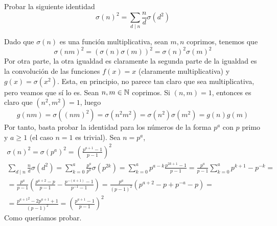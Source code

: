 \documentclass[twoside]{article}
\begin{document}
\newpage


\begin{ejercicio}{11}
Probar la siguiente identidad	
\[
\sigma(n)^2 = \sum_{d\mid n} \frac{n}{d}\sigma(d^2) 
\]
\begin{sol}
Dado que $\sigma(n)$ es una función multiplicativa, sean $m,n$ coprimos, tenemos que
\[
\sigma(nm)^2 = (\sigma(n)\sigma(m))^2 = \sigma(n)^2\sigma(m)^2
\]
Por otra parte, la otra igualdad es claramente la segunda parte de la igualdad es la convolución de las funciones $f(x)=x$ (claramente multiplicativa) y $g(x)=\sigma(x^2)$. Esta, en principio, no parece tan claro que sea multiplicativa, pero veamos que sí lo es. Sean $n,m\in\mathbb{N}$ coprimos. Si $(n,m)=1$, entonces es claro que $(n^2,m^2)=1$, luego
$$
g(nm)=\sigma((nm)^2) = \sigma(n^2 m^2)= \sigma(n^2)\sigma(m^2)=g(n)g(m)$$
Por tanto, basta probar la identidad para los números de la forma $p^a$ con $p$ primo y $a\geq 1$ (el caso $n=1$ es trivial). Sea $n=p^a$,
\begin{gather*}
\sigma(n)^2 = \sigma(p^a)^2 = \left(\frac{p^{a+1}-1}{p-1}\right)^2\\  \sum_{d\mid n} \frac{n}{d}\sigma(d^2) = \sum_{k=0}^a \frac{p^a}{p^k}\sigma(p^{2k})= \sum_{k=0}^a p^{a-k}\frac{p^{2k+1}-1}{p-1} = \frac{p^a}{p-1} \sum_{k=0}^a p^{k+1}- p^{-k} = \\
 = \frac{p^a}{p-1} \left(\frac{p^{a+2}-p}{p-1}-\frac{p^{-(a+1)}-1}{p^{-1}-1}\right) = \frac{p^a}{(p-1)^2}(p^{a+2}-p+ p^{-a}-p) = \\
 = \frac{{p^{a+1}}^2-2p^{a+1}+1}{(p-1)^2} =  \left(\frac{p^{a+1}-1}{p-1}\right)^2
\end{gather*}
Como queríamos probar.
\end{sol}
\end{ejercicio}


\newpage
\end{document}
